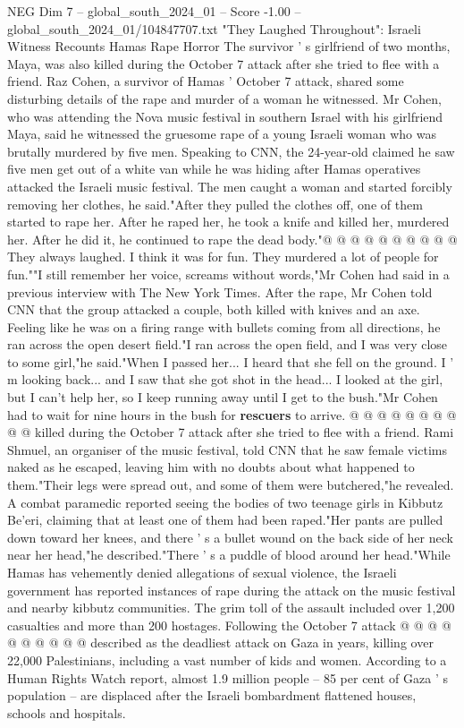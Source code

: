 \begin{textsample}{NEG Dim 7 – global\_south\_2024\_01 – Score -1.00 – global\_south\_2024\_01/104847707.txt}  \label{ex:f7_neg_140}
"They Laughed Throughout": Israeli Witness Recounts Hamas Rape Horror The survivor ' s girlfriend of two months, Maya, was also killed during the October 7 attack after she tried to flee with a friend.
Raz Cohen, a survivor of Hamas ' October 7 attack, shared some disturbing details of the rape and murder of a woman he witnessed.
Mr Cohen, who was attending the Nova music festival in southern Israel with his girlfriend Maya, said he witnessed the gruesome rape of a young Israeli woman who was brutally murdered by five men.
Speaking to CNN, the 24-year-old claimed he saw five men get out of a white van while he was hiding after Hamas operatives attacked the Israeli music festival.
The men caught a woman and started forcibly removing her clothes, he said."After they pulled the clothes off, one of them started to rape her.
After he raped her, he took a knife and killed her, murdered her.
After he did it, he continued to rape the dead body."@ @ @ @ @ @ @ @ @ @ They always laughed.
I think it was for fun.
They murdered a lot of people for fun.""I still remember her voice, screams without words,"Mr Cohen had said in a previous interview with The New York Times.
After the rape, Mr Cohen told CNN that the group attacked a couple, both killed with knives and an axe.
Feeling like he was on a firing range with bullets coming from all directions, he ran across the open desert field."I ran across the open field, and I was very close to some girl,"he said."When I passed her...
I heard that she fell on the ground.
I ' m looking back... and I saw that she got shot in the head...
I looked at the girl, but I can't help her, so I keep running away until I get to the bush."Mr Cohen had to wait for nine hours in the bush for \textbf{rescuers} to arrive. @ @ @ @ @ @ @ @ @ @ killed during the October 7 attack after she tried to flee with a friend.
Rami Shmuel, an organiser of the music festival, told CNN that he saw female victims naked as he escaped, leaving him with no doubts about what happened to them."Their legs were spread out, and some of them were butchered,"he revealed.
A combat paramedic reported seeing the bodies of two teenage girls in Kibbutz Be'eri, claiming that at least one of them had been raped."Her pants are pulled down toward her knees, and there ' s a bullet wound on the back side of her neck near her head,"he described."There ' s a puddle of blood around her head."While Hamas has vehemently denied allegations of sexual violence, the Israeli government has reported instances of rape during the attack on the music festival and nearby kibbutz communities.
The grim toll of the assault included over 1,200 casualties and more than 200 hostages.
Following the October 7 attack @ @ @ @ @ @ @ @ @ @ described as the deadliest attack on Gaza in years, killing over 22,000 Palestinians, including a vast number of kids and women.
According to a Human Rights Watch report, almost 1.9 million people -- 85 per cent of Gaza ' s population -- are displaced after the Israeli bombardment flattened houses, schools and hospitals.

\end{textsample}
